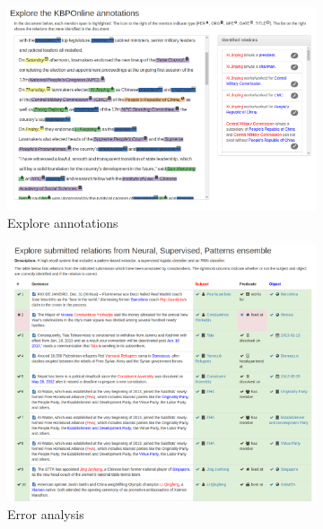 \begin{figure}
  \begin{subfigure}{0.8\textwidth}
    \includegraphics[width=\textwidth]{figures/interface/explore-data}
    \caption{Explore annotations}
  \end{subfigure}

  \begin{subfigure}{0.8\textwidth}
    \includegraphics[width=\textwidth]{figures/interface/errors}
    \caption{Error analysis}
  \end{subfigure}

  \caption[Features of KBP Online]{\label{fig:kbpo:kbpo-features}
  }
\end{figure}

